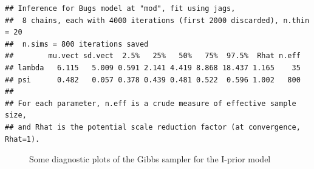 \documentclass[english, 11pt]{article}
\begin{document}
\begin{knitrout}
\color{fgcolor}\begin{kframe}
\begin{verbatim}
## Inference for Bugs model at "mod", fit using jags,
##  8 chains, each with 4000 iterations (first 2000 discarded), n.thin = 20
##  n.sims = 800 iterations saved
##        mu.vect sd.vect  2.5%   25%   50%   75%  97.5%  Rhat n.eff
## lambda   6.115   5.009 0.591 2.141 4.419 8.868 18.437 1.165    35
## psi      0.482   0.057 0.378 0.439 0.481 0.522  0.596 1.002   800
## 
## For each parameter, n.eff is a crude measure of effective sample size,
## and Rhat is the potential scale reduction factor (at convergence, Rhat=1).
\end{verbatim}
\end{kframe}\begin{figure}

{\centering {}

}

\caption[Some diagnostic plots of the Gibbs sampler for the I-prior model]{Some diagnostic plots of the Gibbs sampler for the I-prior model}\label{fig:iprior.jags.res}
\end{figure}


\end{knitrout}
\end{document}
